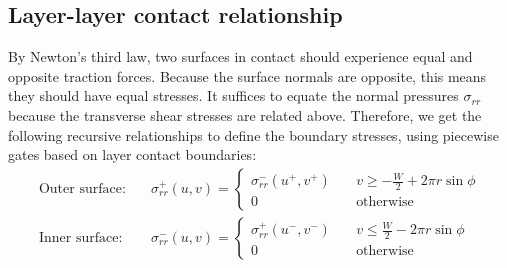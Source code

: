 \documentclass[11pt]{article}
\begin{document}
\subsection{Layer-layer contact relationship}\label{sec:layer_layer_contact}
By Newton's third law, two surfaces in contact should experience equal and opposite traction forces. Because the surface normals are opposite, this means they should have equal stresses. It suffices to equate the normal pressures $\sigma_{rr}$ because the transverse shear stresses are related above. Therefore, we get the following recursive relationships to define the boundary stresses, using piecewise gates based on layer contact boundaries:
\begin{align}
    \text{Outer surface:}&\quad \sigma_{rr}^+\left(u,v\right) = \begin{cases}
        \sigma_{rr}^-\left(u^+,v^+\right) & \quad v \ge -\frac{W}{2}+2\pi r \sin\phi\\
        0 &\quad \text{otherwise}
    \end{cases}\label{eq:contact_outer}\\
    \text{Inner surface:}&\quad\sigma_{rr}^-\left(u,v\right) = \begin{cases}
        \sigma_{rr}^+\left(u^-,v^-\right) & \quad v \le \frac{W}{2}-2\pi r \sin\phi\\
        0 &\quad \text{otherwise}
    \end{cases}\label{eq:contact_inner}\\
\end{align}
\end{document}
